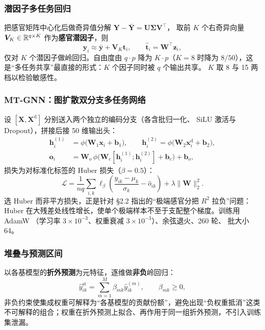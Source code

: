 \subsubsection{潜因子多任务回归}

把感官矩阵中心化后做奇异值分解 $\bm{Y}-\bar{\bm{Y}}=\bm{U}\bm{\Sigma}\bm{V}^{\top}$，
取前 $K$ 个右奇异向量 $\bm{V}_{K}\in\mathbb{R}^{q\times K}$ 作为\textbf{感官潜因子}，则
\begin{equation}
\bm{y}_i \approx \bar{\bm{y}}+\bm{V}_{K}\bm{t}_i ,\qquad
\hat{\bm{t}}_i=\bm{W}^{\top}\bm{z}_i ,
\label{eq:rrr}
\end{equation}
仅对 $K$ 个潜因子做岭回归。自由度由 $q\cdot p$ 降为 $K\cdot p$（$K=8$ 时降为
$8/50$），这是“多任务共享”最直接的形式：$K$ 个因子同时被 $q$ 个输出共享。
$K$ 取 8 与 15 两档以检验敏感性。

\subsubsection{MT-GNN：图扩散双分支多任务网络}

设 $[\bm{X},\bm{X}^{\mathrm{d}}]$ 分别送入两个独立的编码分支（各含批归一化、
SiLU 激活与 Dropout），拼接后接 50 维输出头：
\begin{align}
\bm{h}^{(1)}_i &= \phi\big(\bm{W}_1\bm{x}_i+\bm{b}_1\big),\qquad
\bm{h}^{(2)}_i = \phi\big(\bm{W}_2\bm{x}^{\mathrm{d}}_i+\bm{b}_2\big),\\
\bm{o}_i &= \bm{W}_o\,\phi\big(\bm{W}_c[\bm{h}^{(1)}_i;\bm{h}^{(2)}_i]+\bm{b}_c\big)+\bm{b}_o,
\end{align}
损失为对标准化标签的 Huber 损失（$\beta=0.5$）：
\begin{equation}
\mathcal{L}=\frac{1}{nq}\sum_{i,k}\ell_{\beta}\!\left(\frac{y_{ik}-\mu_k}{\sigma_k}
-\hat o_{ik}\right)+\lambda\|\bm{W}\|_2^{2}.
\label{eq:mtloss}
\end{equation}
选 Huber 而非平方损失，正是针对 \S2.2 指出的“极端感官分把 $R^2$ 拉负”问题：
Huber 在大残差处线性增长，使单个极端样本不至于支配整个梯度。训练用 AdamW
（学习率 $3\times10^{-3}$、权重衰减 $3\times10^{-3}$）、余弦退火、260 轮、
批大小 64。

\subsubsection{堆叠与预测区间}

以各基模型的\textbf{折外预测}为元特征，逐维做\textbf{非负}岭回归：
\begin{equation}
\hat y_{ik}^{\mathrm{st}}=\sum_{m=1}^{M}\beta_{mk}\hat y^{(m)}_{ik},\qquad
\beta_{mk}\ge 0,
\label{eq:stack}
\end{equation}
非负约束使集成权重可解释为“各基模型的贡献份额”，避免出现“负权重抵消”这类
不可解释的组合；权重在折外预测上拟合、再作用于同一组折外预测，不引入训练集泄漏。

